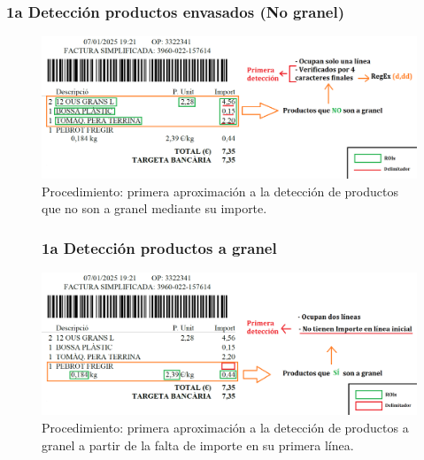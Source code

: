 \documentclass{beamer}
\begin{document}
	
		\begin{frame}	
			\frametitle{1a Detección productos envasados (No granel)}
			\begin{figure}
				\centering
				\includegraphics[width=1\linewidth]{imgEspecifiques/ticketExtraccioN1}
				\caption{Procedimiento: primera aproximación a la detección de productos que no son a granel mediante su importe.}
				\label{fig:ticketextraccionN1}
			\end{figure}
		\end{frame}
		

	
		\begin{frame}	
			\begin{figure}
				\frametitle{1a Detección productos a granel}
				\centering
				\includegraphics[width=1\linewidth]{imgEspecifiques/ticketExtraccioN2}
				\caption{Procedimiento: primera aproximación a la detección de productos a granel a partir de la falta de importe en su primera línea.}
				\label{fig:ticketextraccionN2}
			\end{figure}
		\end{frame}
	
\end{document}
